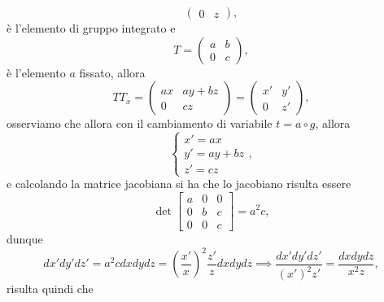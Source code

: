 \begin{example}
\begin{enumerate}[label=\protect\circled{\arabic*}]
\begin{equation}
\begin{pmatrix}
                    0 & z
                \end{pmatrix},
            \end{equation}
            è l'elemento di gruppo integrato e
            \begin{equation}
                T = \begin{pmatrix}
                    a & b \\
                    0 & c
                \end{pmatrix},
            \end{equation}
            è l'elemento $a$ fissato, allora
            \begin{equation}
                T T_x = \begin{pmatrix}
                    ax & ay + bz \\
                    0  & cz
                \end{pmatrix} = \begin{pmatrix}
                    x' & y' \\
                    0 & z'
                \end{pmatrix},
            \end{equation}
            osserviamo che allora con il cambiamento di variabile $t = a \circ g$, allora
            \begin{equation}
                \begin{cases}
                    x' = ax \\
                    y' = ay + bz \\
                    z' = cz
                \end{cases},
            \end{equation}
            e calcolando la matrice jacobiana si ha che lo jacobiano risulta essere
            \begin{equation}
                \det{\begin{bmatrix}
                    a & 0 & 0 \\
                    0 & b & c \\
                    0 & 0 & c
                \end{bmatrix}} = a^2 c,
            \end{equation}
            dunque
            \begin{equation}
                dx' dy' dz' = a^2 c dx dy dz = \left( \frac{x'}{x} \right)^2 \frac{z'}{z} dx dy dz \implies \frac{dx' dy' dz'}{(x')^2 z'} = \frac{dx dy dz}{x^2 z},
            \end{equation}
            risulta quindi che 
            

\end{enumerate}
\end{example}
